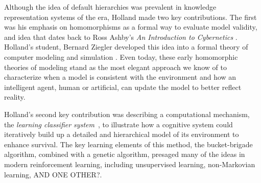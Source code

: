 \documentclass{sig-alternate}
\begin{document}

Although the idea of default hierarchies was prevalent in 
knowledge representation systems of the era, Holland made two key
contributions.  The first was his emphasis on homomorphisms as a formal way to
evaluate model validity, and  idea that dates back to Ross Ashby's
\emph{An Introduction to Cybernetics} \cite{Ashby1956}. Holland's student,
Bernard Ziegler developed this idea into a formal theory of computer modeling
and simulation \cite{Ziegler1976}.  
Even today, these early homomorphic theories of modeling
stand as the most elegant approach we know of to characterize when
a model is consistent with the environment and how an intelligent
agent, human or artificial, can update the model to better reflect
reality.

Holland's second key contribution was describing a computational
mechanism, the \emph{learning classifier
  system}~\cite{Holland1977,Holland1986}, to illustrate how a cognitive system could
iteratively build up a detailed and hierarchical model of its
environment to enhance survival.  The key learning elements of this method, the
bucket-brigade algorithm, combined with a genetic algorithm, presaged many of the ideas in modern reinforcement
learning, including unsupervised learning, non-Markovian learning, AND
ONE OTHER?.


\end{document}
